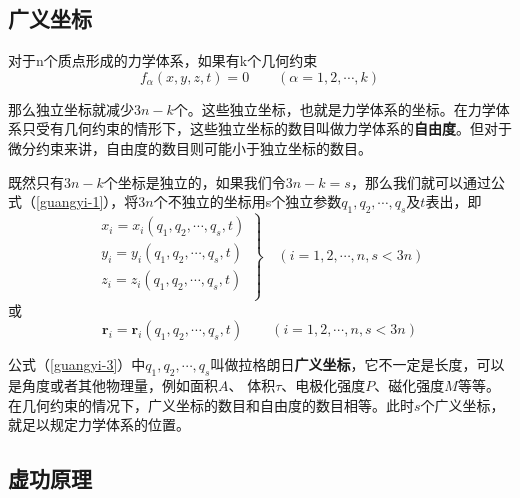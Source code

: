 \documentclass[withoutpreface,bwprint]{cumcmthesis} %
\begin{document}
\subsection{广义坐标}
\par 对于n个质点形成的力学体系，如果有k个几何约束
\begin{equation}
	\label{guangyi-1}
	f_\alpha (x,y,z,t) = 0 \qquad (\alpha = 1,2,\cdots,k)
\end{equation}
\par 那么独立坐标就减少$3n-k$个。这些独立坐标，也就是力学体系的坐标。在力学体系只受有几何约束的情形下，这些独立坐标的数目叫做力学体系的\textbf{自由度}。但对于微分约束来讲，自由度的数目则可能小于独立坐标的数目。
\par 既然只有$3n-k$个坐标是独立的，如果我们令$3n-k=s$，那么我们就可以通过公式（\ref{guangyi-1}），将$3n$个不独立的坐标用s个独立参数$q_1,q_2,\cdots,q_s$及$t$表出，即
\begin{equation}
	\label{guangyi-2}
\left. 
  	\begin{array}{lr}  
  	x_i = x_i (q_1,q_2,\cdots,q_s,t)\\
  	y_i = y_i (q_1,q_2,\cdots,q_s,t)\\
  	z_i = z_i (q_1,q_2,\cdots,q_s,t)\\   
	\end{array}  
\right\} \quad (i = 1,2,\cdots,n,s<3n)  
\end{equation}
或
\begin{equation}
	\label{guangyi-3}
	\textbf{r}_i = \textbf{r}_i (q_1,q_2,\cdots,q_s,t) \qquad (i = 1,2,\cdots,n,s<3n)
\end{equation}
\par 公式（\ref{guangyi-3}）中$q_1,q_2,\cdots,q_s$叫做拉格朗日\textbf{广义坐标}，它不一定是长度，可以是角度或者其他物理量，例如面积$A$、 体积$\tau$、电极化强度$P$、磁化强度$M$等等。在几何约束的情况下，广义坐标的数目和自由度的数目相等。此时$s$个广义坐标，就足以规定力学体系的位置。
\subsection{虚功原理}
\end{document}
